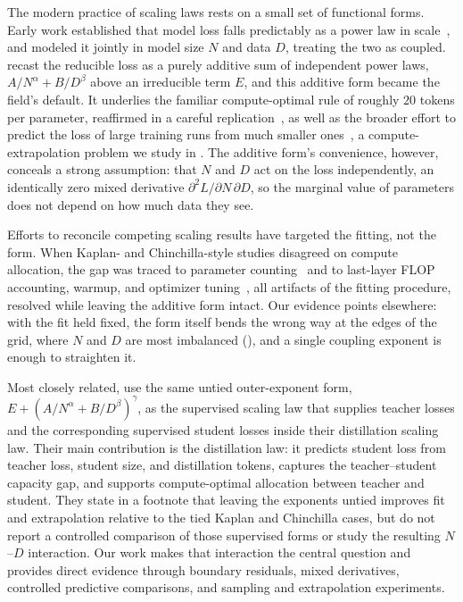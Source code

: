 \documentclass[]{fairmeta}
\begin{document}
The modern practice of scaling laws rests on a small set of functional forms. Early work established that model loss falls predictably as a power law in scale~\citep{hestness2017deep,rosenfeld2019constructive}, and \citet{kaplan2020scaling} modeled it jointly in model size $N$ and data $D$, treating the two as coupled. \citet{hoffmann2022training} recast the reducible loss as a purely additive sum of independent power laws, $A/N^{\alpha}+B/D^{\beta}$ above an irreducible term $E$, and this additive form became the field's default. It underlies the familiar compute-optimal rule of roughly $20$ tokens per parameter, reaffirmed in a careful replication~\citep{besiroglu2024chinchilla}, as well as the broader effort to predict the loss of large training runs from much smaller ones~\citep{bi2024deepseek}, a compute-extrapolation problem we study in . The additive form's convenience, however, conceals a strong assumption: that $N$ and $D$ act on the loss independently, an identically zero mixed derivative $\partial^{2}L/\partial N\,\partial D$, so the marginal value of parameters does not depend on how much data they see.

Efforts to reconcile competing scaling results have targeted the fitting, not the form. When Kaplan- and Chinchilla-style studies disagreed on compute allocation, the gap was traced to parameter counting~\citep{pearce2024reconciling} and to last-layer FLOP accounting, warmup, and optimizer tuning~\citep{porian2024resolving}, all artifacts of the fitting procedure, resolved while leaving the additive form intact. Our evidence points elsewhere: with the fit held fixed, the form itself bends the wrong way at the edges of the grid, where $N$ and $D$ are most imbalanced (), and a single coupling exponent is enough to straighten it.

Most closely related, \citet{busbridge2025distillation} use the same untied outer-exponent form, $E+(A/N^{\alpha}+B/D^{\beta})^{\gamma}$, as the supervised scaling law that supplies teacher losses and the corresponding supervised student losses inside their distillation scaling law. Their main contribution is the distillation law: it predicts student loss from teacher loss, student size, and distillation tokens, captures the teacher--student capacity gap, and supports compute-optimal allocation between teacher and student. They state in a footnote that leaving the exponents untied improves fit and extrapolation relative to the tied Kaplan and Chinchilla cases, but do not report a controlled comparison of those supervised forms or study the resulting $N$--$D$ interaction. Our work makes that interaction the central question and provides direct evidence through boundary residuals, mixed derivatives, controlled predictive comparisons, and sampling and extrapolation experiments.
\end{document}
